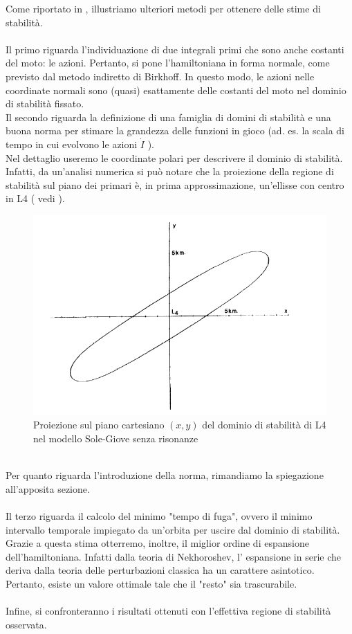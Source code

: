 \documentclass[a4paper,11pt,titlepage]{report}
\theoremstyle{definition}
\theoremstyle{plain}
\begin{document}
Come riportato in \cite{OTSA}, illustriamo ulteriori metodi per ottenere delle stime di stabilità.
\\\\Il primo riguarda l'individuazione di due integrali primi che sono anche costanti del moto: le azioni. Pertanto, si pone l'hamiltoniana in forma normale, come previsto dal metodo indiretto di Birkhoff. In questo modo, le azioni nelle coordinate normali sono (quasi) esattamente delle costanti del moto nel dominio di stabilità fissato. 
\\Il secondo riguarda la definizione di una famiglia di domini di stabilità e una buona norma per stimare la grandezza delle funzioni in gioco (ad. es. la scala di tempo in cui evolvono le azioni \(\dot{I}\) ). \\Nel dettaglio useremo le coordinate polari per descrivere il dominio di stabilità.  
Infatti, da un'analisi numerica si può notare che la proiezione della regione di stabilità sul piano dei primari è, in prima approssimazione, un'ellisse con centro in L4 ( vedi \cite{1989}).
\begin{figure}[h]
	\label{fig:Ellisse}
	\centering
	\includegraphics[scale=0.8]{Ellisse.png}
	\caption{Proiezione sul piano cartesiano $(x,y)$ del dominio di stabilità di L4 nel modello Sole-Giove senza risonanze\cite{1989}} 
\end{figure}
\\Per quanto riguarda l'introduzione della norma, rimandiamo la spiegazione all'apposita sezione.
\\\\Il terzo riguarda il calcolo del minimo "tempo di fuga", ovvero il minimo intervallo temporale impiegato da un'orbita per uscire dal dominio di stabilità. 
Grazie a questa stima otterremo, inoltre, il miglior ordine di espansione dell'hamiltoniana. 
Infatti dalla teoria di Nekhoroshev, l' espansione in serie che deriva dalla teoria delle perturbazioni classica ha un carattere asintotico. Pertanto, esiste un valore ottimale tale che il "resto" sia trascurabile.  
\\\\Infine, si confronteranno i risultati ottenuti con l'effettiva regione di stabilità osservata.
\end{document}
